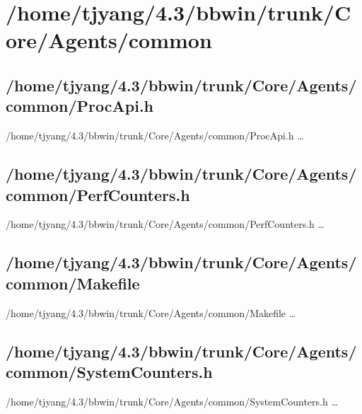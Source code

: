 \section{/home/tjyang/4.3/bbwin/trunk/Core/Agents/common}


\subsection{/home/tjyang/4.3/bbwin/trunk/Core/Agents/common/ProcApi.h}
\lstset{numberstyle=\tiny,numbers=left,
   breaklines=true,
   stepnumber=1,numbersep=5pt,firstnumber=1,
   xleftmargin=12pt,showstringspaces=false}
\noindent /home/tjyang/4.3/bbwin/trunk/Core/Agents/common/ProcApi.h  \ldots



\subsection{/home/tjyang/4.3/bbwin/trunk/Core/Agents/common/PerfCounters.h}
\lstset{numberstyle=\tiny,numbers=left,
   breaklines=true,
   stepnumber=1,numbersep=5pt,firstnumber=1,
   xleftmargin=12pt,showstringspaces=false}
\noindent /home/tjyang/4.3/bbwin/trunk/Core/Agents/common/PerfCounters.h  \ldots



\subsection{/home/tjyang/4.3/bbwin/trunk/Core/Agents/common/Makefile}
\lstset{numberstyle=\tiny,numbers=left,
   breaklines=true,
   stepnumber=1,numbersep=5pt,firstnumber=1,
   xleftmargin=12pt,showstringspaces=false}
\noindent /home/tjyang/4.3/bbwin/trunk/Core/Agents/common/Makefile  \ldots



\subsection{/home/tjyang/4.3/bbwin/trunk/Core/Agents/common/SystemCounters.h}
\lstset{numberstyle=\tiny,numbers=left,
   breaklines=true,
   stepnumber=1,numbersep=5pt,firstnumber=1,
   xleftmargin=12pt,showstringspaces=false}
\noindent /home/tjyang/4.3/bbwin/trunk/Core/Agents/common/SystemCounters.h  \ldots





